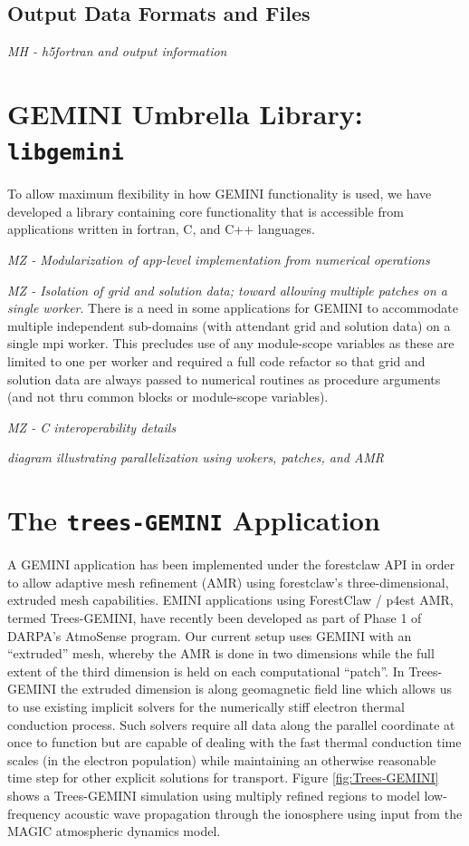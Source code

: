 \documentclass[11pt,letterpaper]{article}
\begin{document}
\subsection{Output Data Formats and Files}

\emph{MH - h5fortran and output information}


\section{GEMINI Umbrella Library:  \texttt{libgemini}}

To allow maximum flexibility in how GEMINI functionality is used, we have developed a library containing core functionality that is accessible from applications written in fortran, C, and C++ languages.  

\emph{MZ - Modularization of app-level implementation from numerical operations}

\emph{MZ - Isolation of grid and solution data; toward allowing multiple patches on a single worker}.  There is a need in some applications for GEMINI to accommodate multiple independent sub-domains (with attendant grid and solution data) on a single mpi worker.  This precludes use of any module-scope variables as these are limited to one per worker and required a full code refactor so that grid and solution data are always passed to numerical routines as procedure arguments (and not thru common blocks or module-scope variables).  

\emph{MZ - C interoperability details}

\emph{diagram illustrating parallelization using wokers, patches, and AMR}



\section{The \texttt{trees-GEMINI} Application}

A GEMINI application has been implemented under the forestclaw API in order to allow adaptive mesh refinement (AMR) using forestclaw's three-dimensional, extruded mesh capabilities.  EMINI applications using ForestClaw / p4est AMR, termed Trees-GEMINI, have recently been developed as part of Phase 1 of DARPA's AtmoSense program.  Our current setup uses GEMINI with an ``extruded'' mesh, whereby the AMR is done in two dimensions while the full extent of the third dimension is held on each computational ``patch''.  In Trees-GEMINI the extruded dimension is along geomagnetic field line which allows us to use existing implicit solvers for the numerically stiff electron thermal conduction process.  Such solvers require all data along the parallel coordinate at once to function but are capable of dealing with the fast thermal conduction time scales (in the electron population) while maintaining an otherwise reasonable time step for other explicit solutions for transport.  Figure \ref{fig:Trees-GEMINI} shows a Trees-GEMINI simulation using multiply refined regions to model low-frequency acoustic wave propagation through the ionosphere using input from the MAGIC atmospheric dynamics model.  
\end{document}
